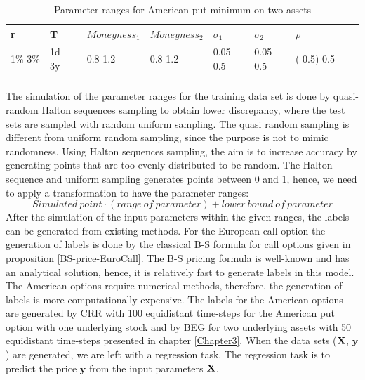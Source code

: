 \begin{table}[th]
\caption[Parameter Ranges In-sample for MLP on Bivariate Contingent Claim]{Parameter ranges for American put minimum on two assets}
\label{tab:ExoticParRange}
\centering
\begin{tabular}{l l l l l l l l l}
\toprule
\textbf{r} & \textbf{T} & $Moneyness_1$ & $Moneyness_2$ & $\sigma_1$ & $\sigma_2$ & $\rho$ \\
\midrule
1\%-3\% & 1d - 3y & 0.8-1.2 & 0.8-1.2 & 0.05-0.5 & 0.05-0.5 & (-0.5)-0.5\\
\bottomrule\\
\end{tabular}
\end{table}

The simulation of the parameter ranges for the training data set is done by quasi-random Halton sequences sampling to obtain lower discrepancy, where the test sets are sampled with random uniform sampling. The quasi random sampling is different from uniform random sampling, since the purpose is not to mimic randomness. Using Halton sequences sampling, the aim is to increase accuracy by generating points that are too evenly distributed to be random. The Halton sequence and uniform sampling generates points between 0 and 1, hence, we need to apply a transformation to have the parameter ranges:
$$Simulated \ point \cdot (range \ of \ parameter) + lower \ bound \ of \ parameter$$
After the simulation of the input parameters within the given ranges, the labels can be generated from existing methods. For the European call option the generation of labels is done by the classical B-S formula for call options given in proposition \ref{BS-price-EuroCall}. The B-S pricing formula is well-known and has an analytical solution, hence, it is relatively fast to generate labels in this model. The American options require numerical methods, therefore, the generation of labels is more computationally expensive. The labels for the American options are generated by CRR with 100 equidistant time-steps for the American put option with one underlying stock and by BEG for two underlying assets with 50 equidistant time-steps presented in chapter \ref{Chapter3}. When the data sets ($\mathbf{X}$, $\bm{y}$) are generated, we are left with a regression task. The regression task is to predict the price $\bm{y}$ from the input parameters $\mathbf{X}$.\\ 

